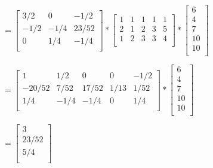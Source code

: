 \documentclass[12pt]{article}
\begin{document}
\begin{enumerate}
  $= \begin{bmatrix}
    3/2 & 0 & -1/2 \\
    -1/2 & -1/4 & 23/52 \\
    0 & 1/4 & -1/4 \\
    \end{bmatrix} *
    \begin{bmatrix}
      1 & 1 & 1 & 1 & 1 \\
      2 & 1 & 2 & 3 & 5 \\
      1 & 2 & 3 & 3 & 4 \\
    \end{bmatrix} *
    \begin{bmatrix}
      6 \\
      4 \\
      7 \\
      10 \\
      10 \\
    \end{bmatrix}$

  $= \begin{bmatrix}
      1 & 1/2 & 0 & 0 & -1/2 \\
      -20/52 & 7/52 & 17/52 & 1/13 & 1/52 \\
      1/4 & -1/4 & -1/4 & 0 & 1/4 \\
    \end{bmatrix} *
    \begin{bmatrix}
      6 \\
      4 \\
      7 \\
      10 \\
      10 \\
    \end{bmatrix}$

  $= \begin{bmatrix}
    3 \\
    23/52 \\
    5/4 \\
  \end{bmatrix}$

\end{enumerate}
\end{document}
